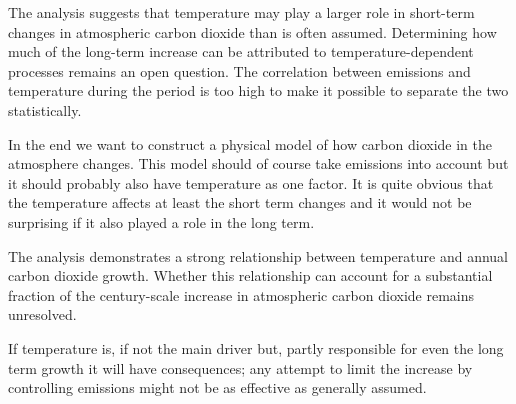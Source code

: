 \documentclass[a4paper,11pt]{article}
\begin{document}
The analysis suggests that temperature may play a larger role in
short-term changes in atmospheric carbon dioxide than is often
assumed. Determining how much of the long-term increase can be
attributed to temperature-dependent processes remains an open
question. The correlation between emissions and temperature during the
period is too high to make it possible to separate the two
statistically.

In the end we want to construct a physical model of how carbon dioxide
in the atmosphere changes. This model should of course take emissions
into account but it should probably also have temperature as one
factor. It is quite obvious that the temperature affects at least the
short term changes and it would not be surprising if it also played a
role in the long term.

The analysis demonstrates a strong relationship between temperature
and annual carbon dioxide growth. Whether this relationship can
account for a substantial fraction of the century-scale increase in
atmospheric carbon dioxide remains unresolved.

If temperature is, if not the main driver but, partly responsible for
even the long term growth it will have consequences; any attempt to
limit the increase by controlling emissions might not be as effective
as generally assumed.

\end{document}
